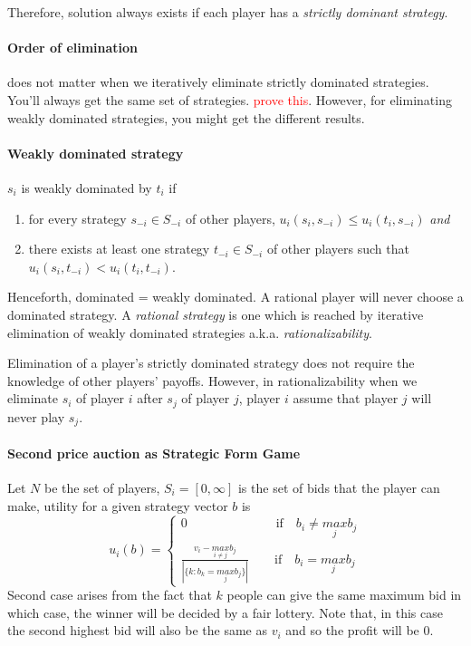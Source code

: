 Therefore, solution always exists if each player has a \textit{strictly dominant strategy}.

\paragraph{Order of elimination} does not matter when we iteratively eliminate strictly dominated strategies. You'll always get the same set of strategies. \textcolor{red}{prove this}. However, for eliminating weakly dominated strategies, you might get the different results.

\paragraph{Weakly dominated strategy} $s_i$ is weakly dominated by $t_i$ if 
\begin{enumerate}
	\item for every strategy $s_{-i} \in S_{-i}$ of other players, $u_i(s_i, s_{-i}) \leq u_i(t_i, s_{-i})$ \textit{and}
	\item there exists at least one strategy $t_{-i} \in S_{-i}$ of other players such that $u_i(s_i, t_{-i}) < u_i(t_i, t_{-i})$.
\end{enumerate}

Henceforth, dominated = weakly dominated. A rational player will never choose a dominated strategy. A \textit{rational strategy} is one which is reached by iterative elimination of weakly dominated strategies a.k.a. \textit{rationalizability}. 

Elimination of a player's strictly dominated strategy does not require the knowledge of other players' payoffs. However, in rationalizability when we eliminate $s_i$ of player $i$ after $s_j$ of player $j$, player $i$ assume that player $j$ will never play $s_j$.

\paragraph{Second price auction as Strategic Form Game} Let $N$ be the set of players, $S_i = [0, \infty]$ is the set of bids that the player can make, utility for a given strategy vector $b$ is 
\[
u_i(b) = 
\begin{cases}
0 \quad \quad \quad \quad \quad \quad \quad \text{if} \quad b_i \neq \underset{j}{max}b_j\\
\frac{v_i - \underset{i \neq j}{max}b_j}{|\{k: b_k = \underset{j}{max}b_j\}|} \quad \quad \text{if} \quad b_i = \underset{j}{max}b_j
\end{cases}
\]
Second case arises from the fact that $k$ people can give the same maximum bid in which case, the winner will be decided by a fair lottery. Note that, in this case the second highest bid will also be the same as $v_i$ and so the profit will be 0.

